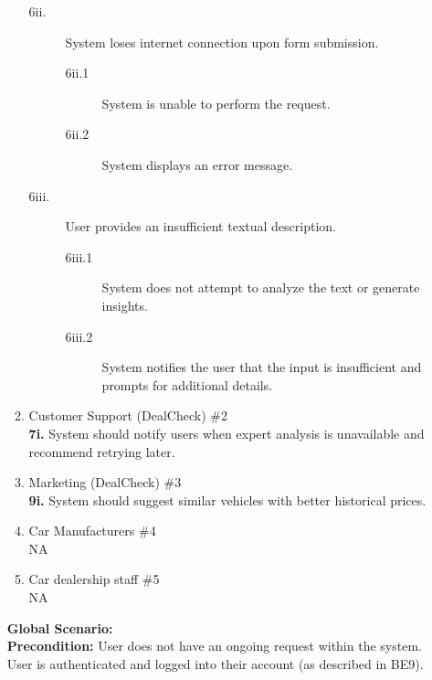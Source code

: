 \documentclass[]{article}
\begin{document}
\begin{enumerate}[{\bf {BE}1.}]
\begin{enumerate}[{\bf VP1.}]
\begin{description}
			\item [6ii.] System loses internet connection upon form submission.
			\begin{description}
				\item [6ii.1] System is unable to perform the request.
				\item [6ii.2] System displays an error message.
			\end{description}
		
			\item [6iii.] User provides an insufficient textual description.
			\begin{description}
				\item [6iii.1] System does not attempt to analyze the text or generate insights.
				\item [6iii.2] System notifies the user that the input is insufficient and prompts for additional details.
			\end{description}
		\end{description}
    
        \item Customer Support (DealCheck) \#2 \\
            \textbf{7i.} System should notify users when expert analysis is unavailable and recommend retrying later.
        \item Marketing (DealCheck) \#3 \\
            \textbf{9i.} System should suggest similar vehicles with better historical prices.
        \item Car Manufacturers \#4 \\
            NA
        \item Car dealership staff \#5 \\
            NA
    \end{enumerate}
    {\bf Global Scenario:}\\
    {\bf Precondition:} User does not have an ongoing request within the system. User is authenticated and logged into their account (as described in BE9).
    

\end{enumerate}
\end{document}
